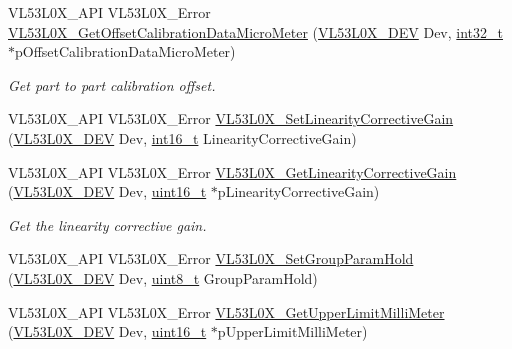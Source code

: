 \begin{DoxyCompactItemize}
\item 
V\+L53\+L0\+X\+\_\+\+A\+PI V\+L53\+L0\+X\+\_\+\+Error \hyperlink{group__VL53L0X__general__group_ga724ec9400a6d5667e10bda476cc43029}{V\+L53\+L0\+X\+\_\+\+Get\+Offset\+Calibration\+Data\+Micro\+Meter} (\hyperlink{group__VL53L0X__platform__group_ga2d6405308b1dd524b462f1b8fb97d167}{V\+L53\+L0\+X\+\_\+\+D\+EV} Dev, \hyperlink{vl53l0x__types_8h_a32f2e37ee053cf2ce8ca28d1f74630e5}{int32\+\_\+t} $\ast$p\+Offset\+Calibration\+Data\+Micro\+Meter)
\begin{DoxyCompactList}\small\item\em Get part to part calibration offset. \end{DoxyCompactList}\item 
V\+L53\+L0\+X\+\_\+\+A\+PI V\+L53\+L0\+X\+\_\+\+Error \hyperlink{group__VL53L0X__general__group_ga9dca9bb612d109f31caae8f1eef38ac7}{V\+L53\+L0\+X\+\_\+\+Set\+Linearity\+Corrective\+Gain} (\hyperlink{group__VL53L0X__platform__group_ga2d6405308b1dd524b462f1b8fb97d167}{V\+L53\+L0\+X\+\_\+\+D\+EV} Dev, \hyperlink{vl53l0x__types_8h_aa343fa3b3d06292b959ffdd4c4703b06}{int16\+\_\+t} Linearity\+Corrective\+Gain)
\item 
V\+L53\+L0\+X\+\_\+\+A\+PI V\+L53\+L0\+X\+\_\+\+Error \hyperlink{group__VL53L0X__general__group_ga921717fe0182527ce358b9c5ded340f1}{V\+L53\+L0\+X\+\_\+\+Get\+Linearity\+Corrective\+Gain} (\hyperlink{group__VL53L0X__platform__group_ga2d6405308b1dd524b462f1b8fb97d167}{V\+L53\+L0\+X\+\_\+\+D\+EV} Dev, \hyperlink{vl53l0x__types_8h_a273cf69d639a59973b6019625df33e30}{uint16\+\_\+t} $\ast$p\+Linearity\+Corrective\+Gain)
\begin{DoxyCompactList}\small\item\em Get the linearity corrective gain. \end{DoxyCompactList}\item 
V\+L53\+L0\+X\+\_\+\+A\+PI V\+L53\+L0\+X\+\_\+\+Error \hyperlink{group__VL53L0X__general__group_ga907d0e788b6ea0c7368a4c5133e0cb6a}{V\+L53\+L0\+X\+\_\+\+Set\+Group\+Param\+Hold} (\hyperlink{group__VL53L0X__platform__group_ga2d6405308b1dd524b462f1b8fb97d167}{V\+L53\+L0\+X\+\_\+\+D\+EV} Dev, \hyperlink{vl53l0x__types_8h_aba7bc1797add20fe3efdf37ced1182c5}{uint8\+\_\+t} Group\+Param\+Hold)
\item 
V\+L53\+L0\+X\+\_\+\+A\+PI V\+L53\+L0\+X\+\_\+\+Error \hyperlink{group__VL53L0X__general__group_gafa2d49e10b749cd6e57e50823184fea7}{V\+L53\+L0\+X\+\_\+\+Get\+Upper\+Limit\+Milli\+Meter} (\hyperlink{group__VL53L0X__platform__group_ga2d6405308b1dd524b462f1b8fb97d167}{V\+L53\+L0\+X\+\_\+\+D\+EV} Dev, \hyperlink{vl53l0x__types_8h_a273cf69d639a59973b6019625df33e30}{uint16\+\_\+t} $\ast$p\+Upper\+Limit\+Milli\+Meter)

\end{DoxyCompactItemize}
